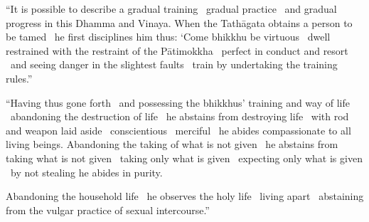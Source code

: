 \begin{justify}
  “It is possible to describe a gradual training \breathmark\ gradual practice \breathmark\ and gradual progress in this Dhamma and Vinaya. When the Tathāgata obtains a person to be tamed \breathmark\ he first disciplines him thus: ‘Come bhikkhu be virtuous \breathmark\ dwell restrained with the restraint of the Pātimokkha \breathmark\ perfect in conduct and resort \breathmark\ and seeing danger in the slightest faults \breathmark\ train by undertaking the training rules.”
\end{justify}

\suttaRef{[MN 107]}

\begin{justify}
  “Having thus gone forth \breathmark\ and possessing the bhikkhus’ training and way of life \breathmark\ abandoning the destruction of life \breathmark\ he abstains from destroying life \breathmark\ with rod and weapon laid aside \breathmark\ conscientious \breathmark\ merciful \breathmark\ he abides compassionate to all living beings. Abandoning the taking of what is not given \breathmark\ he abstains from taking what is not given \breathmark\ taking only what is given \breathmark\ expecting only what is given \breathmark\ by not stealing he abides in purity.
\end{justify}

\begin{justify}
  Abandoning the household life \breathmark\ he observes the holy life \breathmark\ living apart \breathmark\ abstaining from the vulgar practice of sexual intercourse.”
\end{justify}

